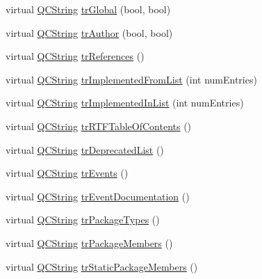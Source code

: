 \begin{DoxyCompactItemize}
\item 
virtual \mbox{\hyperlink{class_q_c_string}{Q\+C\+String}} \mbox{\hyperlink{class_translator_japanese_af77cef2f7175f04e29588d2eedb4accd}{tr\+Global}} (bool, bool)
\item 
virtual \mbox{\hyperlink{class_q_c_string}{Q\+C\+String}} \mbox{\hyperlink{class_translator_japanese_a1d20c21ed02a1ab2f4fb7b6db59a7e58}{tr\+Author}} (bool, bool)
\item 
virtual \mbox{\hyperlink{class_q_c_string}{Q\+C\+String}} \mbox{\hyperlink{class_translator_japanese_aa830da2a5eeb6a506c907e597376af0c}{tr\+References}} ()
\item 
virtual \mbox{\hyperlink{class_q_c_string}{Q\+C\+String}} \mbox{\hyperlink{class_translator_japanese_ac2e4cbb4cdbf04f217211f6035e6f20a}{tr\+Implemented\+From\+List}} (int num\+Entries)
\item 
virtual \mbox{\hyperlink{class_q_c_string}{Q\+C\+String}} \mbox{\hyperlink{class_translator_japanese_ad9c3549fb27b3a61b1ab51f9d424beb3}{tr\+Implemented\+In\+List}} (int num\+Entries)
\item 
virtual \mbox{\hyperlink{class_q_c_string}{Q\+C\+String}} \mbox{\hyperlink{class_translator_japanese_a17418fd40efebdcce6a71679c57454f1}{tr\+R\+T\+F\+Table\+Of\+Contents}} ()
\item 
virtual \mbox{\hyperlink{class_q_c_string}{Q\+C\+String}} \mbox{\hyperlink{class_translator_japanese_af90f29d1e0a9ab6d2edf88a47705fece}{tr\+Deprecated\+List}} ()
\item 
virtual \mbox{\hyperlink{class_q_c_string}{Q\+C\+String}} \mbox{\hyperlink{class_translator_japanese_aa76891354ed3cd9b0ccdd0aab601b022}{tr\+Events}} ()
\item 
virtual \mbox{\hyperlink{class_q_c_string}{Q\+C\+String}} \mbox{\hyperlink{class_translator_japanese_a5c0b0cd38680a740837e989505918799}{tr\+Event\+Documentation}} ()
\item 
virtual \mbox{\hyperlink{class_q_c_string}{Q\+C\+String}} \mbox{\hyperlink{class_translator_japanese_a3a0ca96e9bd66dfd07c036fd83b4ce1a}{tr\+Package\+Types}} ()
\item 
virtual \mbox{\hyperlink{class_q_c_string}{Q\+C\+String}} \mbox{\hyperlink{class_translator_japanese_a16b15f694d21b68f06d73b613e01a0fa}{tr\+Package\+Members}} ()
\item 
virtual \mbox{\hyperlink{class_q_c_string}{Q\+C\+String}} \mbox{\hyperlink{class_translator_japanese_a033a9b24fc7cbfa2f8c9bb0ebe70d684}{tr\+Static\+Package\+Members}} ()
\item 

\end{DoxyCompactItemize}
